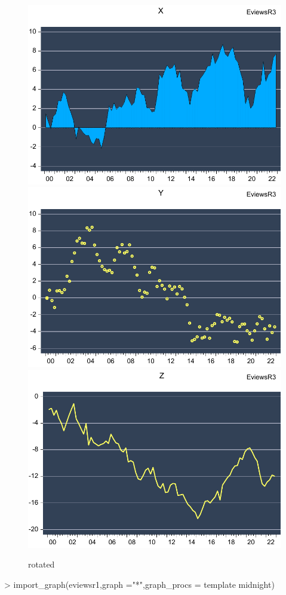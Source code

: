 \documentclass[
]{article}
\newenvironment{Shaded}{\begin{snugshade}}{\end{snugshade}}
\newcommand{\AttributeTok}[1]{\textcolor[rgb]{0.77,0.63,0.00}{#1}}
\newcommand{\FunctionTok}[1]{\textcolor[rgb]{0.00,0.00,0.00}{#1}}
\newcommand{\NormalTok}[1]{#1}
\newcommand{\SpecialCharTok}[1]{\textcolor[rgb]{0.00,0.00,0.00}{#1}}
\newcommand{\StringTok}[1]{\textcolor[rgb]{0.31,0.60,0.02}{#1}}
\begin{document}
\begin{figure}[h]

{\centering \includegraphics[width=0.2\linewidth]{test_files/figure-latex//eviews12-eviewsr3-GRAPH1} \includegraphics[width=0.2\linewidth]{test_files/figure-latex//eviews12-eviewsr3-GRAPH2} \includegraphics[width=0.2\linewidth]{test_files/figure-latex//eviews12-eviewsr3-GRAPH3} 

}

\caption{rotated}\label{fig:eviews12}
\end{figure}

\begin{Shaded}
\begin{Highlighting}[]
\SpecialCharTok{\textgreater{}} \FunctionTok{import\_graph}\NormalTok{(}\StringTok{\textquotesingle{}eviewsr1\textquotesingle{}}\NormalTok{,}\AttributeTok{graph =}\StringTok{"*"}\NormalTok{,}\AttributeTok{graph\_procs =} \StringTok{\textquotesingle{}template midnight\textquotesingle{}}\NormalTok{)}
\end{Highlighting}
\end{Shaded}
\end{document}
